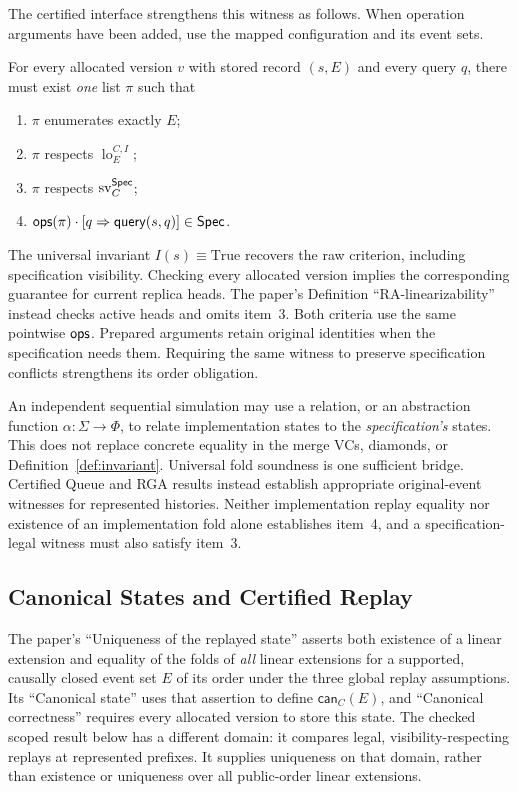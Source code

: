 The certified interface strengthens this witness as follows. When operation
arguments have been added, use the mapped configuration and its event sets.
\begin{definition}
\label{def:ra}
For every allocated version $v$ with stored record $(s,E)$ and every query $q$,
there must exist \emph{one} list $\pi$ such that
\begin{enumerate}[nosep]
\item $\pi$ enumerates exactly $E$;
\item $\pi$ respects $\operatorname{lo}^{C,I}_{E}$;
\item $\pi$ respects $\operatorname{sv}^{\mathsf{Spec}}_C$;
\item $\mathsf{ops}(\pi)\cdot
 [q\Rightarrow\mathsf{query}(s,q)]\in\mathsf{Spec}$.
\end{enumerate}
\end{definition}
The universal invariant $I(s)\equiv\mathrm{True}$ recovers the raw
criterion, including specification visibility. Checking every allocated
version implies the corresponding guarantee for current replica heads.
The paper's Definition ``RA-linearizability'' instead checks active heads
and omits item~3. Both criteria use the same pointwise $\mathsf{ops}$.
Prepared arguments retain original identities when the specification needs
them. Requiring the same witness to preserve specification conflicts
strengthens its order obligation.

An independent sequential simulation may use a relation, or an abstraction
function $\alpha:\Sigma\to\Phi$, to relate implementation states to the
\emph{specification's} states. This does not replace concrete equality in the
merge VCs, diamonds, or Definition~\ref{def:invariant}. Universal fold soundness
is one sufficient bridge. Certified Queue and RGA results instead establish
appropriate original-event witnesses for represented histories. Neither
implementation replay equality nor existence of an implementation fold alone
establishes item~4, and a specification-legal witness must also satisfy item~3.

\subsection{Canonical States and Certified Replay}
The paper's ``Uniqueness of the replayed state'' asserts both existence of a
linear extension and equality of the folds of \emph{all} linear extensions
for a supported, causally closed event set $E$
of its order under the three global replay assumptions. Its ``Canonical
state'' uses that assertion to define $\mathsf{can}_C(E)$, and ``Canonical
correctness'' requires every allocated version to store this state.
The checked scoped result below has a different domain: it compares legal,
visibility-respecting replays at represented prefixes. It supplies uniqueness
on that domain, rather than existence or uniqueness over all public-order
linear extensions.

